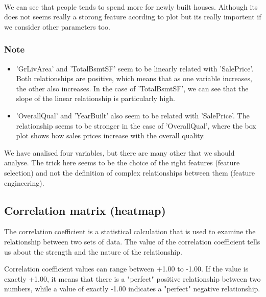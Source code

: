\documentclass[11pt, a4paper , landscape]{article}
\providecommand{\tightlist}{%
      \setlength{\itemsep}{0pt}\setlength{\parskip}{0pt}}
\begin{document}
    \begin{center}
    \end{center}
    { \hspace*{\fill} \\}
    
    We can see that people tends to spend more for newly built houses.
Although its does not seems really a storong feature acording to plot
but its really importent if we consider other parameters too.

    \subsubsection{Note}\label{note}

\begin{itemize}
\tightlist
\item
  'GrLivArea' and 'TotalBsmtSF' seem to be linearly related with
  'SalePrice'. Both relationships are positive, which means that as one
  variable increases, the other also increases. In the case of
  'TotalBsmtSF', we can see that the slope of the linear relationship is
  particularly high.
\item
  'OverallQual' and 'YearBuilt' also seem to be related with
  'SalePrice'. The relationship seems to be stronger in the case of
  'OverallQual', where the box plot shows how sales prices increase with
  the overall quality.
\end{itemize}

We have analised four variables, but there are many other that we should
analyse. The trick here seems to be the choice of the right features
(feature selection) and not the definition of complex relationships
between them (feature engineering).

    \subsection{Correlation matrix
(heatmap)}\label{correlation-matrix-heatmap}

    The correlation coefficient is a statistical calculation that is used to
examine the relationship between two sets of data. The value of the
correlation coefficient tells us about the strength and the nature of
the relationship.

Correlation coefficient values can range between +1.00 to -1.00. If the
value is exactly +1.00, it means that there is a "perfect" positive
relationship between two numbers, while a value of exactly -1.00
indicates a "perfect" negative relationship.
\end{document}
